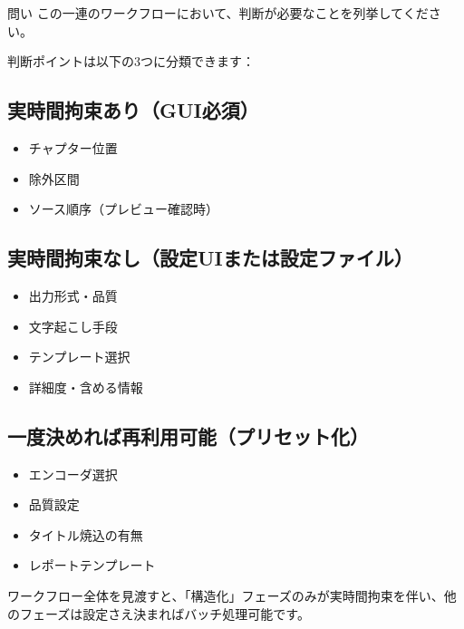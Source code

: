 \documentclass[10pt,a4paper,twocolumn]{ltjsarticle}
\begin{document}
\begin{itembox}[l]{問い}
この一連のワークフローにおいて、判断が必要なことを列挙してください。
\end{itembox}

判断ポイントは以下の3つに分類できます：

\subsection{実時間拘束あり（GUI必須）}
\begin{itemize}
\item チャプター位置
\item 除外区間
\item ソース順序（プレビュー確認時）
\end{itemize}

\subsection{実時間拘束なし（設定UIまたは設定ファイル）}
\begin{itemize}
\item 出力形式・品質
\item 文字起こし手段
\item テンプレート選択
\item 詳細度・含める情報
\end{itemize}

\subsection{一度決めれば再利用可能（プリセット化）}
\begin{itemize}
\item エンコーダ選択
\item 品質設定
\item タイトル焼込の有無
\item レポートテンプレート
\end{itemize}

ワークフロー全体を見渡すと、「構造化」フェーズのみが実時間拘束を伴い、他のフェーズは設定さえ決まればバッチ処理可能です。

\vspace{0.5\baselineskip}
\vspace{0.5\baselineskip}
\end{document}
